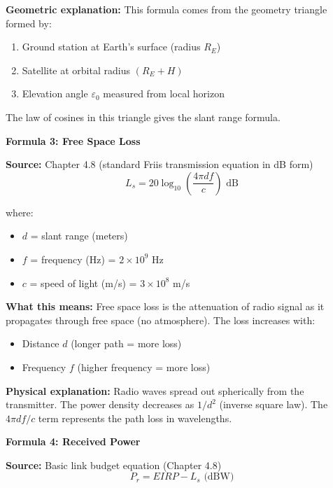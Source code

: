 \documentclass[11pt,letterpaper]{article}
\begin{document}
\textbf{Geometric explanation:} This formula comes from the geometry triangle formed by:
\begin{enumerate}
    \item Ground station at Earth's surface (radius $R_E$)
    \item Satellite at orbital radius $(R_E + H)$
    \item Elevation angle $\varepsilon_0$ measured from local horizon
\end{enumerate}

The law of cosines in this triangle gives the slant range formula.

\vspace{0.3cm}

\textbf{Formula 3: Free Space Loss}

\textbf{Source:} Chapter 4.8 (standard Friis transmission equation in dB form)
\begin{equation}
L_s = 20 \log_{10}\left(\frac{4\pi d f}{c}\right) \text{ dB}
\end{equation}

where:
\begin{itemize}
    \item $d$ = slant range (meters)
    \item $f$ = frequency (Hz) = $2 \times 10^9$ Hz
    \item $c$ = speed of light (m/s) = $3 \times 10^8$ m/s
\end{itemize}

\textbf{What this means:} Free space loss is the attenuation of radio signal as it propagates through free space (no atmosphere). The loss increases with:
\begin{itemize}
    \item Distance $d$ (longer path = more loss)
    \item Frequency $f$ (higher frequency = more loss)
\end{itemize}

\textbf{Physical explanation:} Radio waves spread out spherically from the transmitter. The power density decreases as $1/d^2$ (inverse square law). The $4\pi d f / c$ term represents the path loss in wavelengths.

\vspace{0.3cm}

\textbf{Formula 4: Received Power}

\textbf{Source:} Basic link budget equation (Chapter 4.8)
\begin{equation}
P_r = EIRP - L_s \text{ (dBW)}
\end{equation}
\end{document}
